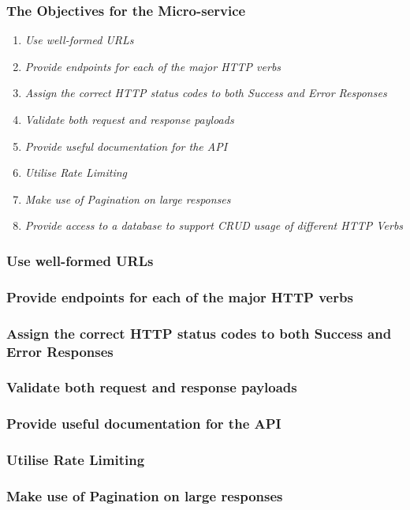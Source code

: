 \subsubsection{The Objectives for the Micro-service}
\begin{enumerate}
    \item \textit{Use well-formed URLs}
    \item \textit{Provide endpoints for each of the major HTTP verbs}
    \item \textit{Assign the correct HTTP status codes to both Success and Error Responses}
    \item \textit{Validate both request and response payloads}
    \item \textit{Provide useful documentation for the API}
    \item \textit{Utilise Rate Limiting}
    \item \textit{Make use of Pagination on large responses}
    \item \textit{Provide access to a database to support CRUD usage of different HTTP Verbs}
\end{enumerate}
\subsubsection{Use well-formed URLs}
\subsubsection{Provide endpoints for each of the major HTTP verbs}
\subsubsection{Assign the correct HTTP status codes to both Success and Error Responses}
\subsubsection{Validate both request and response payloads}
\subsubsection{Provide useful documentation for the API}
\subsubsection{Utilise Rate Limiting}
\subsubsection{Make use of Pagination on large responses}
